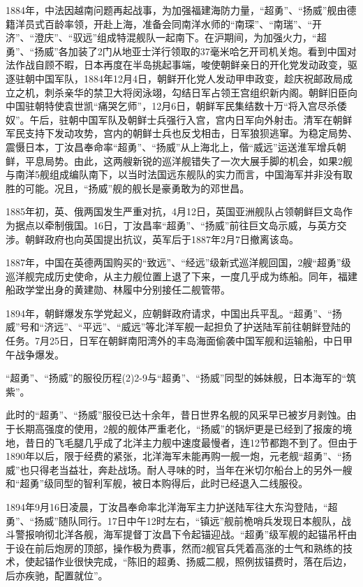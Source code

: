 \documentclass[12pt,UTF8]{ctexbook}
\begin{document}
1884年，中法因越南问题再起战事，为加强福建海防力量，“超勇”、“扬威”舰由德籍洋员式百龄率领，开赴上海，准备会同南洋水师的“南琛”、“南瑞”、“开济”、“澄庆”、“驭远”组成特混舰队一起南下。在沪期间，为加强火力，“超勇”、“扬威”各加装了2门从地亚士洋行领取的37毫米哈乞开司机关炮。看到中国对法作战自顾不暇，日本再度在半岛挑起事端，唆使朝鲜亲日的开化党发动政变，驱逐驻朝中国军队，1884年12月4日，朝鲜开化党人发动甲申政变，趁庆祝邮政局成立之机，刺杀亲华的禁卫大将闵泳翊，勾结日军占领王宫组织新内阁。朝鲜旧臣向中国驻朝特使袁世凯“痛哭乞师”，12月6日，朝鲜军民集结数十万“将入宫尽杀倭奴”。午后，驻朝中国军队及朝鲜士兵强行入宫，宫内日军向外射击。清军在朝鲜军民支持下发动攻势，宫内的朝鲜士兵也反戈相击，日军狼狈逃窜。为稳定局势、震慑日本，丁汝昌奉命率“超勇”、“扬威”从上海北上，偕“威远”运送淮军增兵朝鲜，平息局势。由此，这两艘新锐的巡洋舰错失了一次大展手脚的机会，如果2舰与南洋5舰组成编队南下，以当时法国远东舰队的实力而言，中国海军并非没有取胜的可能。况且，“扬威”舰的舰长是豪勇敢为的邓世昌。

1885年初，英、俄两国发生严重对抗，4月12日，英国亚洲舰队占领朝鲜巨文岛作为据点以牵制俄国。16日，丁汝昌率“超勇”、“扬威”前往巨文岛示威，与英方交涉。朝鲜政府也向英国提出抗议，英军后于1887年2月7日撤离该岛。

1887年，中国在英德两国购买的“致远”、“经远”级新式巡洋舰回国，2艘“超勇”级巡洋舰完成历史使命，从主力舰位置上退了下来，一度几乎成为练船。同年，福建船政学堂出身的黄建勋、林履中分别接任二舰管带。

1894年，朝鲜爆发东学党起义，应朝鲜政府请求，中国出兵平乱。“超勇”、“扬威”号和“济远”、“平远”、“威远”等北洋军舰一起担负了护送陆军前往朝鲜登陆的任务。7月25日，日军在朝鲜南阳湾外的丰岛海面偷袭中国军舰和运输船，中日甲午战争爆发。

“超勇”、“扬威”的服役历程(2)2-9与“超勇”、“扬威”同型的姊妹舰，日本海军的“筑紫”。

此时的“超勇”、“扬威”服役已达十余年，昔日世界名舰的风采早已被岁月剥蚀。由于长期高强度的使用，2舰的舰体严重老化，“扬威”的锅炉更是已经到了报废的境地，昔日的飞毛腿几乎成了北洋主力舰中速度最慢者，连12节都跑不到了。但由于1890年以后，限于经费的紧张，北洋海军未能再购一舰一炮，元老舰“超勇”、“扬威”也只得老当益壮，奔赴战场。耐人寻味的时，当年在米切尔船台上的另外一艘和“超勇”级同型的智利军舰，被日本购得后，此时已经退入二线服役。

1894年9月16日凌晨，丁汝昌奉命率北洋海军主力护送陆军往大东沟登陆，“超勇”、“扬威”随队同行。17日中午12时左右，“镇远”舰前桅哨兵发现日本舰队，战斗警报响彻北洋各舰，海军提督丁汝昌下令起锚迎战。“超勇”级军舰的起锚吊杆由于设在前后炮房的顶部，操作极为费事，然而2舰官兵凭着高涨的士气和熟练的技术，使起锚作业很快完成，“陈旧的超勇、扬威二舰，照例拔锚费时，落在后边，后亦疾驰，配置就位”。
\end{document}
